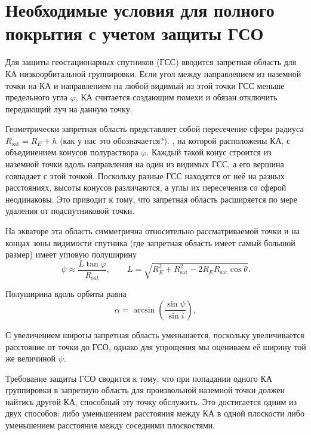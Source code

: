 \section{Необходимые условия для полного покрытия с учетом защиты ГСО}
\label{subsec:geo_condition}

% 
Для защиты геостационарных спутников (ГСС) вводится запретная область для 
КА низкоорбитальной группировки. Если угол между направлением из наземной 
точки на КА и направлением на любой видимый из этой точки ГСС меньше предельного 
угла $\varphi$, КА считается создающим помехи и обязан отключить передающий 
луч на данную точку.

Геометрически запретная область представляет собой пересечение сферы 
радиуса $R_{\text{sat}} = R_E + h$ 
(как у нас это обозначается?).
, на которой расположены КА, с 
объединением конусов полураствора $\varphi$. Каждый такой конус строится 
из наземной точки вдоль направления на один из видимых ГСС, а его вершина 
совпадает с этой точкой. Поскольку разные ГСС находятся от неё на разных 
расстояниях, высоты конусов различаются, а углы их пересечения со сферой 
неодинаковы. Это приводит к тому, что запретная область расширяется по мере 
удаления от подспутниковой точки. 

На экваторе эта область симметрична относительно рассматриваемой 
точки и на концах зоны видимости спутника 
(где запретная область имеет самый большой размер) 
имеет угловую полуширину
\begin{equation}
\psi \approx \frac{L \tan\varphi}{R_{\text{sat}}},
\qquad
L = \sqrt{R_E^2 + R_{\text{sat}}^2 - 2 R_E R_{\text{sat}} \cos\theta}.
\label{eq:psi}
\end{equation}

Полуширина вдоль орбиты равна
\begin{equation}
    \alpha =
    \arcsin\!\left(\frac{\sin\psi}{\sin i}\right),
    \label{eq:inplane-alpha}
\end{equation}


С увеличением широты запретная область уменьшается, поскольку увеличивается 
расстояние от точки до ГСО, однако для упрощения мы оцениваем 
её ширину той же величиной $\psi$.

Требование защиты ГСО сводится к тому, что при 
попадании одного КА группировки в запретную область для произвольной 
наземной точки должен найтись другой КА, способный эту точку обслужить. 
Это достигается одним из двух способов: либо уменьшением расстояния 
между КА в одной плоскости либо уменьшением расстояния между соседними плоскостями.

